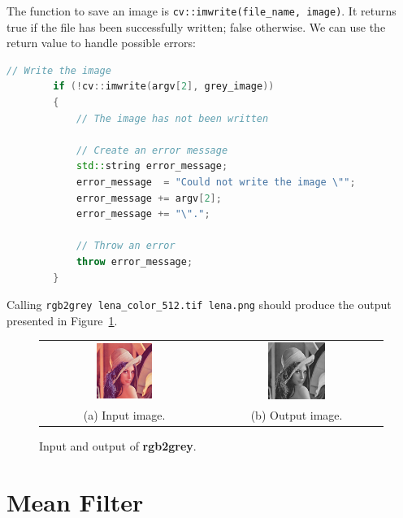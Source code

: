 \documentclass[english,a4paper,12pt,oneside]{article}
\begin{document}
The function to save an image is \verb+cv::imwrite(file_name, image)+. 
It returns true if the file has been successfully written; false otherwise. 
We can use the return value to handle possible errors:
\begin{lstlisting}[language=c++,caption=Save an image.]
        // Write the image
        if (!cv::imwrite(argv[2], grey_image))
        {
            // The image has not been written

            // Create an error message
            std::string error_message;
            error_message  = "Could not write the image \"";
            error_message += argv[2];
            error_message += "\".";

            // Throw an error
            throw error_message;
        }
\end{lstlisting}
Calling \verb+rgb2grey lena_color_512.tif lena.png+ should produce the output presented in Figure~\ref{fig:grey}.
    \begin {figure}[htb]
	\centering
	\begin{tabular}{cc}
		\includegraphics[width=0.35\textwidth]{lena_color_512}&
		\includegraphics[width=0.35\textwidth]{lena_grey}\\
		(a) Input image. & (b) Output image.
	\end{tabular}
      \caption{\label{fig:grey}Input and output of \textbf{rgb2grey}.}
    \end {figure}

\section{Mean Filter}
\end{document}

